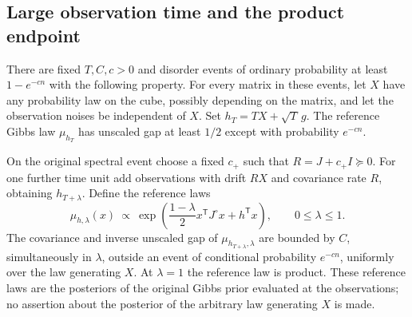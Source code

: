 \subsection{Large observation time and the product endpoint}

\begin{proposition}
\label{prof:terminal-extension}
There are fixed $T,C,c>0$ and disorder events of ordinary probability
at least $1-e^{-cn}$ with the following property.  For every matrix in
these events, let $X$ have any probability law on the cube, possibly
depending on the matrix, and let the observation noises be independent
of $X$.  Set $h_T=TX+\sqrt T\,g$.  The reference Gibbs law $\mu_{h_T}$
has unscaled gap at least $1/2$ except with probability $e^{-cn}$.

On the original spectral event choose a fixed $c_+$ such that
$R=J+c_+I\succeq0$.  For one further time unit add observations with
drift $RX$ and covariance rate $R$, obtaining $h_{T+\lambda}$.
Define the reference laws
\[
 \mu_{h,\lambda}(x)\ \propto\
 \exp\left(\frac{1-\lambda}{2}x^{\mathsf T}J^\circ x
                         +h^{\mathsf T}x\right),
 \qquad 0\le\lambda\le1.
\]
The covariance and inverse unscaled gap of
$\mu_{h_{T+\lambda},\lambda}$ are bounded by $C$, simultaneously in
$\lambda$, outside an event of conditional probability $e^{-cn}$,
uniformly over the law generating $X$.  At $\lambda=1$ the reference
law is product.  These reference laws are the posteriors of the original
Gibbs prior evaluated at the observations; no assertion about the
posterior of the arbitrary law generating $X$ is made.
\end{proposition}

